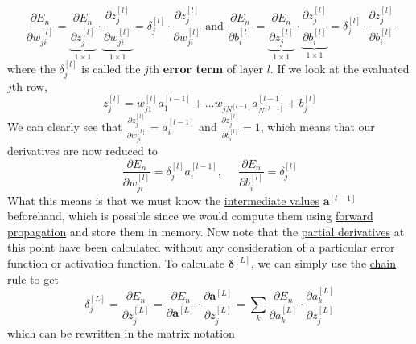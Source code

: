 \begin{algo}[Backpropagation]
\begin{equation}
      \frac{\partial E_n}{\partial w_{ji}^{[l]}} = \underbrace{\frac{\partial E_n}{\partial z^{[l]}_j}}_{1 \times 1} \cdot \underbrace{\frac{\partial z^{[l]}_j}{\partial w_{ji}^{[l]}}}_{1 \times 1} = \delta^{[l]}_j \cdot \frac{\partial z^{[l]}_j}{\partial w_{ji}^{[l]}} \text{ and } \frac{\partial E_n}{\partial b_{i}^{[l]}} = \underbrace{\frac{\partial E_n}{\partial z^{[l]}_j}}_{1 \times 1} \cdot \underbrace{\frac{\partial z^{[l]}_j}{\partial b_{i}^{[l]}}}_{1 \times 1} = \delta^{[l]}_j \cdot \frac{\partial z^{[l]}_j}{\partial b_{i}^{[l]}}
    \end{equation}
    where the $\delta_j^{[l]}$ is called the $j$th \textbf{error term} of layer $l$. If we look at the evaluated $j$th row, 
    \begin{equation}
      z_j^{[l]} = w_{j1}^{[l]} a_1^{[l-1]} + \ldots w_{j N^{[l-1]}} a^{[l-1]}_{N^{[l-1]}} + b_j^{[l]}
    \end{equation}
    We can clearly see that $\frac{\partial z^{[l]}_j}{\partial w_{ji}^{[l]}} = a_i^{[l-1]}$ and $\frac{\partial z^{[l]}_j}{\partial b_{i}^{[l]}} = 1$, which means that our derivatives are now reduced to 
    \begin{equation}
      \frac{\partial E_n}{\partial w_{ji}^{[l]}} = \delta_j^{[l]} a_i^{[l-1]}, \;\;\;\;\; \frac{\partial E_n}{\partial b_{i}^{[l]}} = \delta_j^{[l]}
    \end{equation}
    What this means is that we must know the \hyperref[real-thm:intermediate-value-theorem]{intermediate values} $\mathbf{a}^{[l-1]}$ beforehand, which is possible since we would compute them using \hyperref[def:forward-propagation]{forward propagation} and store them in memory. Now note that the \hyperref[mv-def:partial-derivative]{partial derivatives} at this point have been calculated without any consideration of a particular error function or activation function. To calculate $\boldsymbol{\delta}^{[L]}$, we can simply use the \hyperref[mv-thm:chain-rule]{chain rule} to get 
    \begin{equation}
      \delta_j^{[L]} = \frac{\partial E_n}{\partial z_j^{[L]}} = \frac{\partial E_n}{\partial \mathbf{a}^{[L]}} \cdot \frac{\partial \mathbf{a}^{[L]}}{\partial z_j^{[L]}} = \sum_k \frac{\partial E_n}{\partial a_k^{[L]}} \cdot \frac{\partial a_k^{[L]}}{\partial z_j^{[L]}}
    \end{equation}
    which can be rewritten in the matrix notation
    \begin{equation}

\end{equation}
\end{algo}
